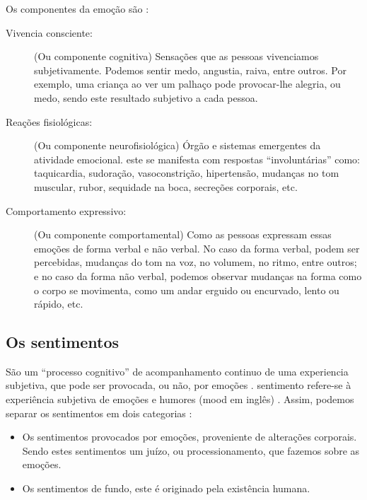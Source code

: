 Os componentes da emoção são \cite[pp. 26]{redorta2006emocion} \cite{freitas2015codigo} \cite{freitas2013psicologia} :
\begin{description}
\item[Vivencia consciente:] (Ou componente cognitiva) Sensações que as pessoas vivenciamos subjetivamente.
Podemos sentir medo, angustia, raiva, entre outros.
Por exemplo, uma criança ao ver um palhaço pode provocar-lhe alegria, ou medo,
sendo este resultado subjetivo a cada pessoa. 
\item[Reações fisiológicas:] (Ou componente neurofisiológica) Órgão e sistemas emergentes da atividade emocional.
este se manifesta com respostas ``involuntárias'' como: 
taquicardia, 
sudoração, 
vasoconstrição, 
hipertensão, 
mudanças no tom muscular,
rubor, 
sequidade na boca, 
secreções corporais, 
etc.
\item[Comportamento expressivo:] (Ou componente comportamental) 
Como as pessoas expressam essas emoções de forma verbal e não verbal.
No caso da forma verbal, podem ser percebidas, mudanças do tom na voz, no volumem, no ritmo, entre outros;
e no caso da forma não verbal, podemos observar mudanças na forma como o corpo se movimenta,
como um andar erguido ou encurvado, lento ou rápido, etc.

\end{description}



\subsection{Os sentimentos} 
\label{subsec:filling}
São um ``processo cognitivo'' 
de acompanhamento continuo de uma experiencia subjetiva, 
que pode ser provocada, ou não, por emoções \cite[pp. 288]{zanelli2014psicologia} \cite{freitas2013psicologia}.
sentimento refere-se à experiência subjetiva de emoções e humores (mood em inglês) \cite[pp. 42]{hofman2015affective}.
Assim, podemos separar os sentimentos em dois categorias \cite[pp. 288]{zanelli2014psicologia}:
\begin{itemize}
\item Os sentimentos provocados por emoções, proveniente de alterações corporais.
Sendo estes sentimentos um juízo, ou processionamento, que fazemos sobre as emoções. 
\item Os sentimentos de fundo, este é originado pela existência humana.
\end{itemize}

